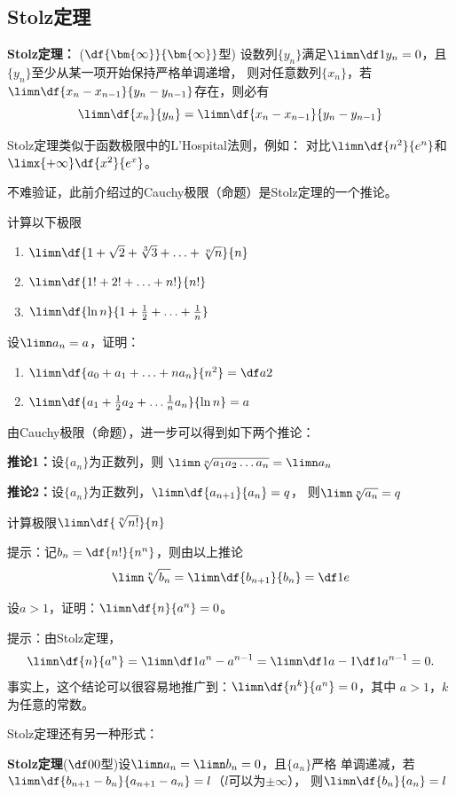 \begin{shaded}
\subsection{Stolz定理}

\begin{thx}
	{\bf Stolz定理：}
	($\df{\bm{\infty}}{\bm{\infty}}$型) 设数列$\{y_n\}$满足$\limn\df
	1{y_n}=0$，且$\{y_n\}$至少从某一项开始保持严格单调递增，
	则对任意数列$\{x_n\}$，若$\limn\df{x_n-x_{n-1}}{y_n-y_{n-1}}$存在，则必有
	$$\limn\df{x_n}{y_n}=\limn\df{x_n-x_{n-1}}{y_n-y_{n-1}}$$
\end{thx}

Stolz定理类似于函数极限中的L'Hospital法则，例如：
对比$\limn\df{n^2}{e^n}$和$\limx{+\infty}\df{x^2}{e^x}$。

不难验证，此前介绍过的Cauchy极限（命题）是Stolz定理的一个推论。

\bs
\egz 计算以下极限
\begin{enumerate}[(1)]
  \setlength{\itemindent}{1cm}
  \item $\limn\df{1+\sqrt 2+\sqrt[3]{3}+\ldots+\sqrt[n]{n}}{n}$ 
  \item $\limn\df{1!+2!+\ldots+n!}{n!}$
  \item $\limn\df{\ln n}{1+\frac12+\ldots+\frac1n}$
\end{enumerate}

\bs
\egz  设$\limn a_n=a$，证明：
\begin{enumerate}[(1)]
  \setlength{\itemindent}{1cm}
  \item $\limn\df{a_0+a_1+\ldots+na_n}{n^2}=\df a2$
  \item $\limn\df{a_1+\frac12a_2+\ldots\frac1na_n}{\ln n}=a$
\end{enumerate}

\bs
由Cauchy极限（命题），进一步可以得到如下两个推论：

\begin{thx}
{\bf 推论1：}设$\{a_n\}$为正数列，则
$\limn\sqrt[n]{a_1a_2\ldots a_n}=\limn a_n$

{\bf 推论2：}设$\{a_n\}$为正数列，$\limn\df{a_{n+1}}{a_n}=q$，
则$\limn\sqrt[n]{a_n}=q$
\end{thx}

\bs
\egz 计算极限$\limn\df{\sqrt[n]{n!}}{n}$

提示：记$b_n=\df{n!}{n^n}$，则由以上推论
$$\limn\sqrt[n]{b_n}=\limn\df{b_{n+1}}{b_n}=\df1e$$

\bs
\egz 设$a>1$，证明：$\limn\df{n}{a^n}=0$。

提示：由Stolz定理，
$$
	\limn\df{n}{a^n}=\limn\df1{a^n-a^{n-1}}
	=\limn\df1{a-1}\df1{a^{n-1}}=0.
$$
事实上，这个结论可以很容易地推广到：$\limn\df{n^k}{a^n}=0$，其中
$a>1$，$k$为任意的常数。

\bs
Stolz定理还有另一种形式：
\begin{thx}
	{\bf Stolz定理}($\df00$型)设$\limn a_n=\limn b_n=0$，且$\{a_n\}$严格
	单调递减，若$\limn\df{b_{n+1}-b_n}{a_{n+1}-a_n}=l$（$l$可以为$\pm\infty$），
	则$\limn\df{b_n}{a_n}=l$
\end{thx}
\end{shaded}


